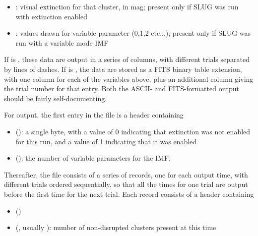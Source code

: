\documentclass[letterpaper,10pt,english]{sphinxmanual}
\begin{document}
\begin{itemize}
\item {} 
: visual extinction for that cluster, in mag; present only if SLUG was run with extinction enabled

\item {} 
: values drawn for variable parameter  (0,1,2 etc...); present only if SLUG was run with a variable mode IMF

\end{itemize}

If  is , these data are output in a series of columns, with different trials separated by lines of dashes. If  is , the data are stored as a FITS binary table extension, with one column for each of the variables above, plus an additional column giving the trial number for that entry. Both the ASCII- and FITS-formatted output should be fairly self-documenting.

For  output, the first entry in the file is a header containing
\begin{itemize}
\item {} 
 (): a single byte, with a value of 0 indicating that extinction was not enabled for this run, and a value of 1 indicating that it was enabled

\item {} 
 (): the number of variable parameters for the IMF.

\end{itemize}

Thereafter, the file consists of a series of records, one for each output time, with different trials ordered sequentially, so that all the times for one trial are output before the first time for the next trial. Each record consists of a header containing
\begin{itemize}
\item {} 
 ()

\item {} 
 (, usually ): number of non-disrupted clusters present at this time

\end{itemize}
\end{document}
